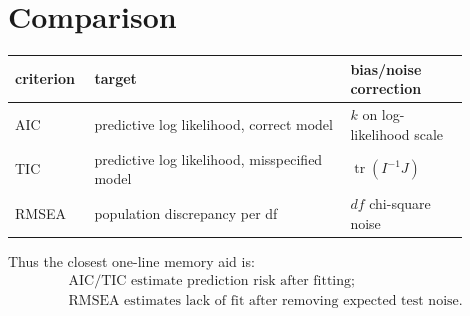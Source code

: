 \documentclass[11pt]{article}
\newcommand{\tr}{\operatorname{tr}}
\theoremstyle{plain}
\theoremstyle{remark}
\begin{document}
\section{Comparison}

\begin{center}
\begin{tabular}{p{0.14\linewidth}p{0.52\linewidth}p{0.24\linewidth}}
criterion & target & bias/noise correction\\
\hline
AIC & predictive log likelihood, correct model & $k$ on log-likelihood scale\\
TIC & predictive log likelihood, misspecified model & $\tr(I^{-1}J)$\\
RMSEA & population discrepancy per df & $df$ chi-square noise
\end{tabular}
\end{center}

Thus the closest one-line memory aid is:
\begin{align*}
  &\text{AIC/TIC estimate prediction risk after fitting;}\\
  &\text{RMSEA estimates lack of fit after removing expected test noise.}
\end{align*}
\end{document}
